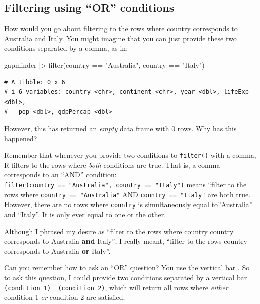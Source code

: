 \documentclass[
  letterpaper,
  DIV=11,
  numbers=noendperiod]{scrreprt}
\newenvironment{Shaded}{\begin{snugshade}}{\end{snugshade}}
\newcommand{\FunctionTok}[1]{\textcolor[rgb]{0.28,0.35,0.67}{#1}}
\newcommand{\NormalTok}[1]{\textcolor[rgb]{0.00,0.23,0.31}{#1}}
\newcommand{\SpecialCharTok}[1]{\textcolor[rgb]{0.37,0.37,0.37}{#1}}
\newcommand{\StringTok}[1]{\textcolor[rgb]{0.13,0.47,0.30}{#1}}
\begin{document}
\subsection{Filtering using ``OR''
conditions}\label{filtering-using-or-conditions}

How would you go about filtering to the rows where country corresponds
to Australia and Italy. You might imagine that you can just provide
these two conditions separated by a comma, as in:

\begin{Shaded}
\begin{Highlighting}[]
\NormalTok{gapminder }\SpecialCharTok{|\textgreater{}} \FunctionTok{filter}\NormalTok{(country }\SpecialCharTok{==} \StringTok{"Australia"}\NormalTok{, country }\SpecialCharTok{==} \StringTok{"Italy"}\NormalTok{)}
\end{Highlighting}
\end{Shaded}

\begin{verbatim}
# A tibble: 0 x 6
# i 6 variables: country <chr>, continent <chr>, year <dbl>, lifeExp <dbl>,
#   pop <dbl>, gdpPercap <dbl>
\end{verbatim}

However, this has returned an \emph{empty} data frame with 0 rows. Why
has this happened?

Remember that whenever you provide two conditions to \texttt{filter()}
with a comma, R filters to the rows where \emph{both} conditions are
true. That is, a comma corresponds to an ``AND'' condition:
\texttt{filter(country\ ==\ "Australia",\ country\ ==\ "Italy")} means
``filter to the rows where \texttt{country\ ==\ "Australia"} AND
\texttt{country\ ==\ "Italy"} are both true. However, there are no rows
where \texttt{country} is simultaneously equal to''Australia'' and
``Italy''. It is only ever equal to one or the other.

Although I phrased my desire as ``filter to the rows where country
country corresponds to Australia \textbf{and} Italy'', I really meant,
``filter to the rows country corresponds to Australia \textbf{or}
Italy''.

Can you remember how to ask an ``OR'' question? You use the vertical bar
\texttt{\textbar{}}. So to ask this question, I could provide two
conditions separated by a vertical bar
\texttt{(condition\ 1)\ \textbar{}\ (condition\ 2)}, which will return
all rows where \emph{either} condition 1 \emph{or} condition 2 are
satisfied.
\end{document}
